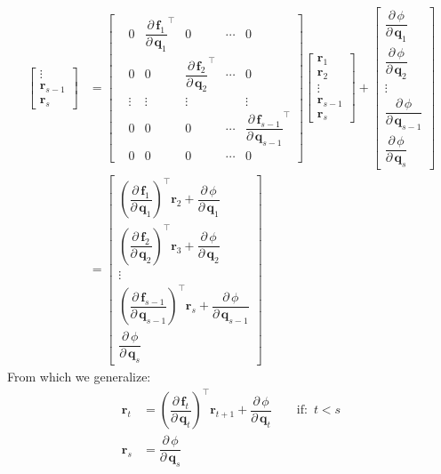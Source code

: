 \documentclass{article}
\newcommand{\pd}[2]{\dfrac{\partial\, #1}{\partial\, #2}}
\begin{document}
\begin{derivation}
\begin{equation*}
\begin{aligned}
\begin{bmatrix}
    \vdots      \\[0.5ex]
    \mathbf{r}_{s-1}\\[0.5ex]
    \mathbf{r}_s
\end{bmatrix} 
&= 
\begin{bmatrix}
& 0 & \pd{\mathbf{f}_1}{\mathbf{q}_1}^\top & 0 & \cdots &  0  \\[0.5ex]
& 0 & 0& \pd{\mathbf{f}_2}{\mathbf{q}_2}^\top  & \cdots &  0  \\[0.5ex]
& \vdots & \vdots & \vdots &  & \vdots   \\[0.5ex]
& 0 & 0 & 0 & \cdots & \pd{\mathbf{f}_{s-1}}{\mathbf{q}_{s-1}}^\top \\[0.5ex]
& 0 & 0 & 0 & \cdots & 0 
\end{bmatrix}
\begin{bmatrix}
    \mathbf{r}_1\\[0.5ex]
    \mathbf{r}_2\\[0.5ex]
    \vdots      \\[0.5ex]
    \mathbf{r}_{s-1}\\[0.5ex]
    \mathbf{r}_s
\end{bmatrix} 
+
\begin{bmatrix}
    \pd{\phi}{\mathbf{q}_1}\\[0.5ex]
    \pd{\phi}{\mathbf{q}_2}\\[0.5ex]
    \vdots      \\[0.5ex]
    \pd{\phi}{\mathbf{q}_{s-1}}\\[0.5ex]
    \pd{\phi}{\mathbf{q}_s}
\end{bmatrix}
 \\
&=
\begin{bmatrix}
     \left(\pd{\mathbf{f}_1}{\mathbf{q}_1}\right)^\top \mathbf{r}_2 + \pd{\phi}{\mathbf{q}_1}\\[0.5ex]
    \left(\pd{\mathbf{f}_2}{\mathbf{q}_2}\right)^\top \mathbf{r}_3 + \pd{\phi}{\mathbf{q}_2}\\[0.5ex]
      \vdots      \\[0.5ex]
     \left(\pd{\mathbf{f}_{s-1}}{\mathbf{q}_{s-1}}\right)^\top \mathbf{r}_s + \pd{\phi}{\mathbf{q}_{s-1}}\\[0.5ex]
     \pd{\phi}{\mathbf{q}_s}
\end{bmatrix}
\end{aligned}
\end{equation*}
From which we generalize:
\begin{equation}
\begin{aligned}
\mathbf{r}_t &= \left(\pd{\mathbf{f}_{t}}{\mathbf{q}_{t}}\right)^\top \mathbf{r}_{t+1} + \pd{\phi}{\mathbf{q}_t} \qquad \text{if: }\, t < s\\[2ex]
    \mathbf{r}_s &= \pd{\phi}{\mathbf{q}_s}
\end{aligned}
\end{equation}
\end{derivation}
\end{document}
